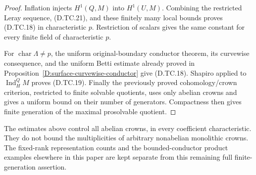 \begin{proof}
Inflation injects $H^1(Q,M)$ into $H^1(U,M)$.
Combining the restricted Leray sequence, (D.TC.21),
and these finitely many local bounds proves (D.TC.18)
in characteristic $p$.  Restriction of scalars gives
the same constant for every finite field of
characteristic $p$.

For $\operatorname{char}\Lambda\ne p$, the uniform
original-boundary conductor theorem, its curvewise
consequence, and the uniform Betti estimate already
proved in Proposition~\ref{D:surface-curvewise-conductor}
give (D.TC.18).  Shapiro applied to
$\operatorname{Ind}_H^Q M$ proves (D.TC.19).
Finally the previously proved cohomology/crown
criterion, restricted to finite solvable quotients,
uses only abelian crowns and gives a uniform bound
on their number of generators.  Compactness then
gives finite generation of the maximal prosolvable
quotient.
\end{proof}

\begin{remark}
The estimates above control all abelian crowns, in
every coefficient characteristic.  They do not
bound the multiplicities of arbitrary nonabelian
monolithic crowns.  The fixed-rank representation
counts and the bounded-conductor product examples
elsewhere in this paper are kept separate from this
remaining full finite-generation assertion.
\end{remark}
